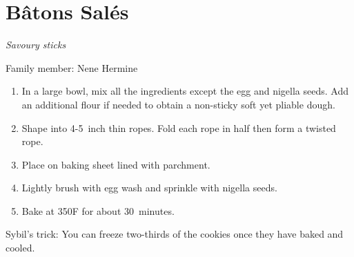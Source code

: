 \chapter{Bâtons Salés}
\label{ch:batonsale}


\textit{Savoury sticks}

Family member: Nene Hermine

\begin{enumerate}
    \item In a large bowl, mix all the ingredients except the egg and nigella seeds. Add an additional flour if needed to obtain a non-sticky soft yet pliable dough.
    \item Shape into 4-5~inch thin ropes. Fold each rope in half then form a twisted rope.
    \item Place on baking sheet lined with parchment.
    \item Lightly brush with egg wash and sprinkle with nigella seeds.
    \item Bake at 350\degree F for about 30~minutes.
\end{enumerate}

Sybil's trick: You can freeze two-thirds of the cookies once they have baked and cooled.
